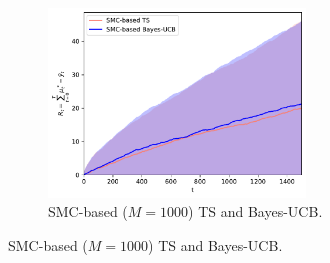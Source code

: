 \begin{figure}[!h]
	\centering
	\begin{subfigure}[b]{\textwidth}
		\centering
		\includegraphics[width=0.75\textwidth]{./fods_figs/static/logistic/A2/theta-0.1_-0.1_0.1_0.1_M1000_cumulative_regret}
		\caption{SMC-based ($M=1000$) TS and Bayes-UCB.}
	\end{subfigure}
	

\end{figure}
